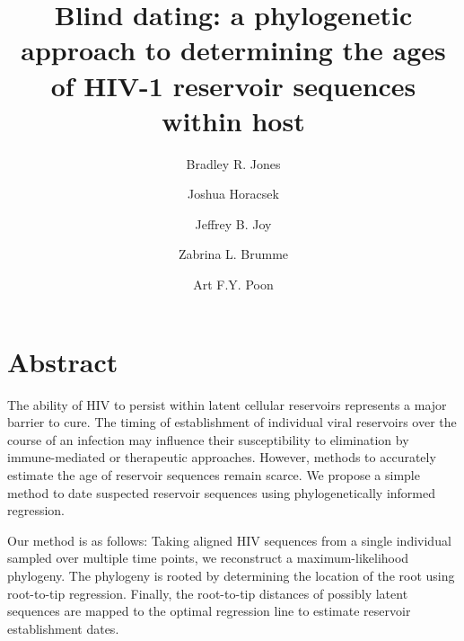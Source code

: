 \documentclass[12pt]{article}
\begin{document}
\title{Blind dating: a phylogenetic approach to determining the ages of HIV-1 reservoir sequences within host}

\author[1,2]{Bradley R. Jones}
\author[1,2]{Joshua Horacsek}
\author[2,3]{Jeffrey B. Joy}
\author[1,2]{Zabrina L. Brumme}
\author[1,2,3,*]{Art F.Y. Poon}
\baselineskip 22pt
\pagewiselinenumbers

\date{}
\maketitle

\section * {Abstract}

The ability of HIV to persist within latent cellular reservoirs represents a major barrier to
cure.
The timing of establishment of individual viral reservoirs over the course of an infection may influence their susceptibility to elimination by immune-mediated or therapeutic approaches.
However, methods to accurately estimate the age of reservoir sequences remain scarce.
We propose a simple method to date suspected reservoir sequences using phylogenetically informed regression.

Our method is as follows: Taking aligned HIV sequences from a single individual sampled over multiple time points, we reconstruct a maximum-likelihood phylogeny.
The phylogeny is rooted by determining the location of the root using root-to-tip regression.
Finally, the root-to-tip distances of possibly latent sequences are mapped to the optimal regression line to estimate reservoir establishment dates.
\end{document}
